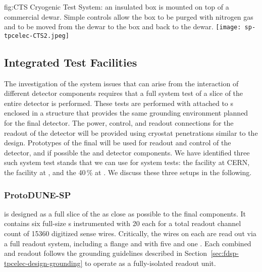 \begin{dunefigure}
{fig:CTS}
{Cryogenic Test System: an insulated box is mounted on top of a commercial \lntwo dewar.  Simple controls allow the box to be purged with nitrogen gas and \lntwo to be moved from the dewar to the box and back to the dewar.}
\texttt{[image: sp-tpcelec-CTS2.jpeg]}
\end{dunefigure}


\subsection{Integrated Test Facilities}
\label{sec:fdsp-tpcelec-qa-facilities}

The investigation of the system issues that can arise from the interaction 
of different detector components requires that a full system test of a slice
of the entire detector is performed. These tests are performed with 
attached to s enclosed in a structure that provides the same
grounding environment planned for the final  detector. The
power, control, and readout connections for the readout of the detector
will be provided using cryostat penetrations similar to the 
design. Prototypes of the final  will be used for readout and
control of the detector, and if possible the  and 
detector components. We have identified three such system test stands
that we can use for system tests: the  facility at CERN, the
 facility at , and the \num{40}\,\%  at .
We discuss these three setups in the following.

\subsubsection{ProtoDUNE-SP}
\label{sec:fdsp-tpcelec-qa-facilities-pdune}

 is designed as a full slice of the  as close as 
possible to the final  components. It contains six full-size 
 s instrumented with \num{20}  each for a 
total readout channel count of \num{15360} digitized sense wires. Critically, 
the wires on each  are read out via a full  readout 
system, including a  flange and  with five  
and one . Each combined  and  readout follows 
the grounding guidelines described in Section~\ref{sec:fdsp-tpcelec-design-grounding} 
to operate as a fully-isolated readout unit.

